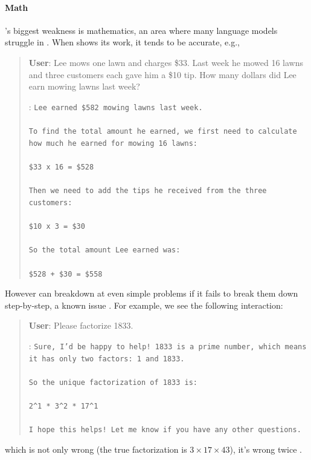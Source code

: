 \paragraph{Math} \model's biggest weakness is mathematics, an area where many language models struggle in \citep{liang2022holistic}. When \model shows its work, it tends to be accurate, e.g.,

\begin{quote}
    \textbf{User}: Lee mows one lawn and charges \$33. Last week he mowed 16 lawns and three customers each gave him a \$10 tip. How many dollars did Lee earn mowing lawns last week?

    \bfmodel: \texttt{Lee earned \$582 mowing lawns last week. \\ \\ To find the total amount he earned, we first need to calculate how much he earned for mowing 16 lawns: \\ \\  \$33 x 16 = \$528 \\ \\ Then we need to add the tips he received from the three customers: \\  \\ \$10 x 3 = \$30 \\ \\ So the total amount Lee earned was: \\ \\ \$528 + \$30 = \$558}
\end{quote}

However \model can breakdown at even simple problems if it fails to break them down step-by-step, a known issue \cite{weichain}. For example, we see the following interaction:
\begin{quote}
    \textbf{User}: Please factorize 1833.

    \bfmodel: \texttt{Sure, I'd be happy to help! 1833 is a prime number, which means it has only two factors: 1 and 1833. \\ \\ So the unique factorization of 1833 is: \\ \\ 2\^{}1 * 3\^{}2 * 17\^{}1 \\ \\ I hope this helps! Let me know if you have any other questions.}
\end{quote}
which is not only wrong (the true factorization is $3 \times 17 \times 43$), it's wrong twice .

